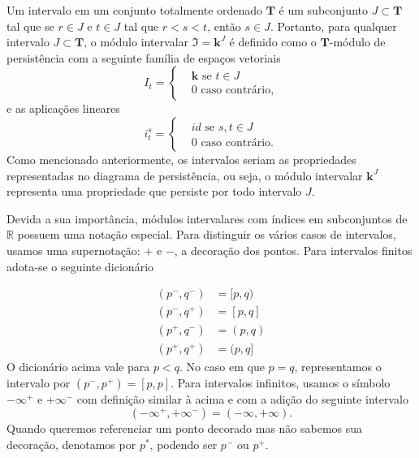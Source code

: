 Um intervalo em um conjunto totalmente ordenado $\mathbf{T}$ é um subconjunto $J \subset \mathbf{T}$ tal que se 
$r \in J$ e $t \in J$ tal que $r < s < t$, então $s \in J$. Portanto, para qualquer intervalo $J \subset \mathbf{T}$,
o módulo intervalar $\mathfrak{I} = \mathbf{k}^J$ é definido como o $\mathbf{T}$-módulo de persistência com a 
seguinte família de espaços vetoriais
\begin{equation*}
    I_t = \left\{
    \begin{split}
        & \mathbf{k} \text{ se } t \in J \\
        & 0 \text{ caso contrário,}
    \end{split}
    \right.
\end{equation*} 
e as aplicações lineares
\begin{equation*}
    i_t^s = \left\{
    \begin{split}
        & id \text{ se } s,t \in J \\
        & 0 \text{ caso contrário.}
    \end{split}
    \right.
\end{equation*}
Como mencionado anteriormente, os intervalos seriam as propriedades representadas no diagrama de persistência, 
ou seja, o módulo intervalar $\mathbf{k}^J$ representa uma propriedade que persiste por todo intervalo $J$.

Devida a sua importância, módulos intervalares com índices em subconjuntos de $\mathbb{R}$ possuem uma notação 
especial. Para distinguir os vários casos de intervalos, usamos uma supernotação: $+$ e $-$, a decoração dos pontos.
Para intervalos finitos adota-se o seguinte dicionário

\begin{align*}
    (p^-, q^-) &= [p,q) \\ 
    (p^-, q^+) &= [p,q] \\
    (p^+, q^-) &= (p,q) \\
    (p^+, q^+) &= (p,q]
\end{align*}
O dicionário acima vale para $p < q$. No caso em que $p=q$, representamos o intervalo por $(p^-, p^+) = [p,p]$. 
Para intervalos infinitos, usamos o símbolo $-\infty^+$ e $+\infty^-$ com definição similar à acima e com a adição
do seguinte intervalo
\begin{equation*}
    (-\infty^+, +\infty^-) = (-\infty, +\infty).
\end{equation*}
Quando queremos referenciar um ponto decorado mas não sabemos sua decoração, denotamos por $p^*$, podendo ser 
$p^-$ ou $p^+$. 

